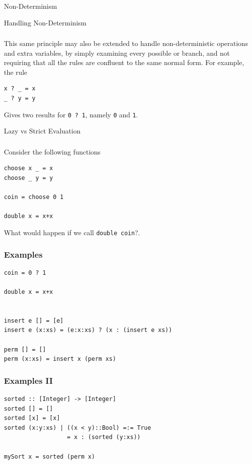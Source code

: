 \documentclass{beamer}
\begin{document}
\begin{section}{Non-Determinism}

\begin{subsection}{Handling Non-Determinism}
\begin{frame}[fragile]
\frametitle{\subsecname}
  This same principle may also be extended to handle non-deterministic operations and extra variables, by simply examining every possible or branch, and not requiring that all the rules are confluent to the same normal form. For example, the rule

\begin{verbatim}
x ? _ = x
_ ? y = y
\end{verbatim}

  Gives two results for \verb|0 ? 1|, namely \verb|0| and \verb|1|.
  
\end{frame}

\end{subsection}
\begin{subsection}{Lazy vs Strict Evaluation}
\begin{frame}
[fragile]
\frametitle{\subsecname}
  Consider the following functions
\begin{verbatim}
choose x _ = x
choose _ y = y

coin = choose 0 1

double x = x+x
\end{verbatim}
What would happen if we call \verb|double coin|?.
\end{frame}
\begin{frame}
[fragile]
\frametitle{{\subsecname} Examples}
\begin{example}
\begin{verbatim}
coin = 0 ? 1

double x = x+x


insert e [] = [e]
insert e (x:xs) = (e:x:xs) ? (x : (insert e xs))

perm [] = []
perm (x:xs) = insert x (perm xs)
\end{verbatim}
\end{example}
\end{frame}
\begin{frame}
[fragile]
\frametitle{{\subsecname} Examples II}
\begin{example}
\begin{verbatim}
sorted :: [Integer] -> [Integer]
sorted [] = []
sorted [x] = [x]
sorted (x:y:xs) | ((x < y)::Bool) =:= True 
                  = x : (sorted (y:xs))

mySort x = sorted (perm x)
\end{verbatim}
\end{example}
\end{frame}
\end{subsection}
\end{section}
\end{document}
